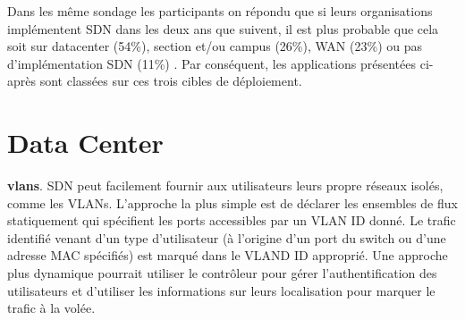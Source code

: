Dans les même sondage les participants on répondu que si leurs organisations implémentent SDN dans les deux ans que suivent, il est plus probable que cela soit sur \gls{datacenter} (54\%), section et/ou campus (26\%), WAN (23\%) ou pas d'implémentation SDN (11\%) \cite{2013GuideSDNNVTable12}. Par conséquent, les applications présentées ci-après sont classées sur ces trois cibles de déploiement.




\section{Data Center}

\textbf{\glspl{vlan}}. SDN peut facilement fournir aux utilisateurs leurs propre réseaux isolés, comme les VLANs. L'approche la plus simple est de déclarer les ensembles de flux statiquement qui spécifient les ports accessibles par un VLAN ID donné. Le trafic identifié venant d'un type d'utilisateur (à l'origine d'un port du switch ou d'une adresse MAC spécifiés) est marqué dans le VLAND ID approprié. Une approche plus dynamique pourrait utiliser le contrôleur pour gérer l'authentification des utilisateurs et d'utiliser les informations sur leurs localisation pour marquer le trafic à la volée. \cite{OpenFlowStanfordUsing} 







